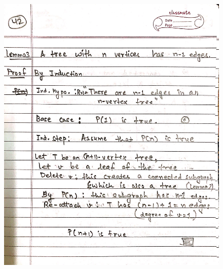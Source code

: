 \begin{figure}[H]
    \centering
    \includegraphics[width=16cm, height=21cm]{"./MIT-6.042J/MIT-6042J-042"}
\end{figure}
\newpage
